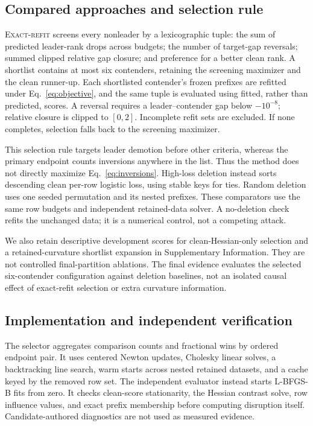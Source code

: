 \documentclass{article}
\newcommand{\Exact}{\textsc{Exact-refit}}
\begin{document}
\subsection{Compared approaches and selection rule}
\Exact{} screens every nonleader by a lexicographic tuple: the sum of predicted leader-rank drops across budgets; the number of target-gap reversals; summed clipped relative gap closure; and preference for a better clean rank. A shortlist contains at most six contenders, retaining the screening maximizer and the clean runner-up. Each shortlisted contender's frozen prefixes are refitted under Eq.~\ref{eq:objective}, and the same tuple is evaluated using fitted, rather than predicted, scores. A reversal requires a leader--contender gap below $-10^{-8}$; relative closure is clipped to $[0,2]$. Incomplete refit sets are excluded. If none completes, selection falls back to the screening maximizer.

This selection rule targets leader demotion before other criteria, whereas the primary endpoint counts inversions anywhere in the list. Thus the method does not directly maximize Eq.~\ref{eq:inversions}. High-loss deletion instead sorts descending clean per-row logistic loss, using stable keys for ties. Random deletion uses one seeded permutation and its nested prefixes. These comparators use the same row budgets and independent retained-data solver. A no-deletion check refits the unchanged data; it is a numerical control, not a competing attack.

We also retain descriptive development scores for clean-Hessian-only selection and a retained-curvature shortlist expansion in Supplementary Information. They are not controlled final-partition ablations. The final evidence evaluates the selected six-contender configuration against deletion baselines, not an isolated causal effect of exact-refit selection or extra curvature information.

\subsection{Implementation and independent verification}
The selector aggregates comparison counts and fractional wins by ordered endpoint pair. It uses centered Newton updates, Cholesky linear solves, a backtracking line search, warm starts across nested retained datasets, and a cache keyed by the removed row set. The independent evaluator instead starts L-BFGS-B fits from zero. It checks clean-score stationarity, the Hessian contrast solve, row influence values, and exact prefix membership before computing disruption itself. Candidate-authored diagnostics are not used as measured evidence.
\end{document}

